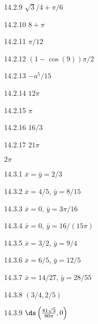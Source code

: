 \begin{Answer}{14.2.9}
$\sqrt3/4+\pi/6$
\end{Answer}
\begin{Answer}{14.2.10}
$8+\pi$
\end{Answer}
\begin{Answer}{14.2.11}
$\pi/12$\
\end{Answer}
\begin{Answer}{14.2.12}
$(1-\cos(9))\pi/2$
\end{Answer}
\begin{Answer}{14.2.13}
$-a^5/15$
\end{Answer}
\begin{Answer}{14.2.14}
$12\pi$
\end{Answer}
\begin{Answer}{14.2.15}
$\pi$
\end{Answer}
\begin{Answer}{14.2.16}
$16/3$
\end{Answer}
\begin{Answer}{14.2.17}
$21\pi$
\end{Answer}
\begin{Answer}{3}
		$2\pi$
		
\end{Answer}
\begin{Answer}{14.3.1}
$\bar x=\bar y=2/3$
\end{Answer}
\begin{Answer}{14.3.2}
$\bar x=4/5$, $\bar y=8/15$
\end{Answer}
\begin{Answer}{14.3.3}
$\bar x=0$, $\bar y=3\pi/16$
\end{Answer}
\begin{Answer}{14.3.4}
$\bar x=0$, $\bar y=16/(15\pi)$
\end{Answer}
\begin{Answer}{14.3.5}
$\bar x=3/2$, $\bar y=9/4$
\end{Answer}
\begin{Answer}{14.3.6}
$\bar x=6/5$, $\bar y=12/5$
\end{Answer}
\begin{Answer}{14.3.7}
$\bar x=14/27$, $\bar y=28/55$
\end{Answer}
\begin{Answer}{14.3.8}
$(3/4,2/5)$
\end{Answer}
\begin{Answer}{14.3.9}
$\ds\left({81\sqrt3\over80\pi},0\right)$
\end{Answer}
